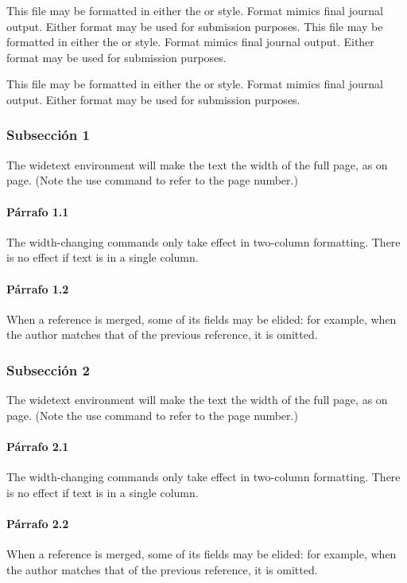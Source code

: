 \documentclass[%
 reprint,
 amsmath,amssymb,
 aps,
]{revtex4-2}
\begin{document}
This file may be formatted in either the or style. Format mimics final journal output. Either format may be used for submission purposes. This file may be formatted in either the or style. Format mimics final journal output. Either format may be used for submission purposes.

This file may be formatted in either the or style. Format mimics final journal output. Either format may be used for submission purposes.

\subsubsection{Subsección 1}
The widetext environment will make the text the width of the
full page, as on page. (Note the use command to refer to the page number.) 

\paragraph{Párrafo 1.1}
The width-changing commands only take effect in two-column formatting. There is no effect if text is in a single column.

\paragraph{Párrafo 1.2}
When a reference is merged, some of its fields may be elided: for example, when the author matches that of the previous reference, it is omitted. 

\subsubsection{Subsección 2}
The widetext environment will make the text the width of the
full page, as on page. (Note the use command to refer to the page number.) 

\paragraph{Párrafo 2.1}
The width-changing commands only take effect in two-column formatting. There is no effect if text is in a single column.

\paragraph{Párrafo 2.2}
When a reference is merged, some of its fields may be elided: for example, when the author matches that of the previous reference, it is omitted. 
\end{document}

